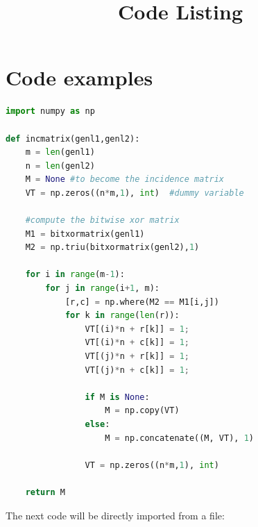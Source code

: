 \documentclass{article}
\title{Code Listing}
\date{ }
\begin{document}
\lstlistoflistings
\maketitle

\section{Code examples}


    

\begin{lstlisting}[language=Python, caption=Python example]
import numpy as np
    
def incmatrix(genl1,genl2):
    m = len(genl1)
    n = len(genl2)
    M = None #to become the incidence matrix
    VT = np.zeros((n*m,1), int)  #dummy variable
    
    #compute the bitwise xor matrix
    M1 = bitxormatrix(genl1)
    M2 = np.triu(bitxormatrix(genl2),1) 

    for i in range(m-1):
        for j in range(i+1, m):
            [r,c] = np.where(M2 == M1[i,j])
            for k in range(len(r)):
                VT[(i)*n + r[k]] = 1;
                VT[(i)*n + c[k]] = 1;
                VT[(j)*n + r[k]] = 1;
                VT[(j)*n + c[k]] = 1;
                
                if M is None:
                    M = np.copy(VT)
                else:
                    M = np.concatenate((M, VT), 1)
                
                VT = np.zeros((n*m,1), int)
    
    return M
\end{lstlisting}

\clearpage

The next code will be directly imported from a file:



\clearpage

\lstlistoflistings
\end{document}

